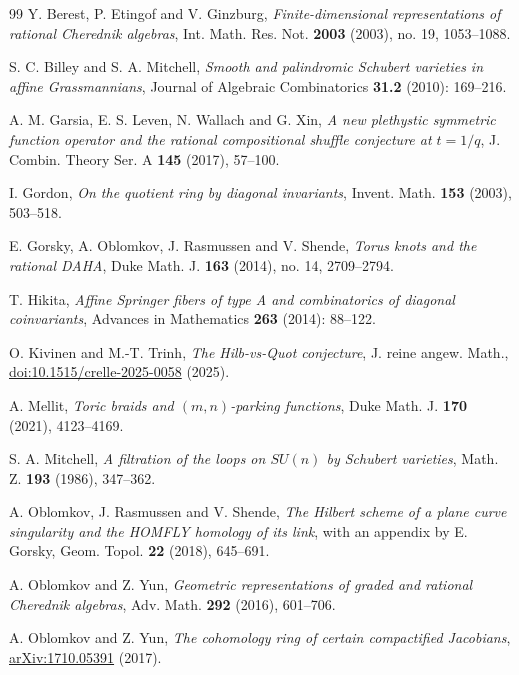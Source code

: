 \documentclass[a4paper,11pt,leqno]{amsart}
\begin{document}
\begin{thebibliography}{99}\small\setlength{\itemsep}{0pt}
 Y. Berest, P. Etingof and V. Ginzburg,
\emph{Finite-dimensional representations of rational Cherednik algebras},
Int. Math. Res. Not. \textbf{2003} (2003), no. 19, 1053--1088.

 S. C. Billey and S. A. Mitchell,
\emph{Smooth and palindromic Schubert varieties in affine Grassmannians},
Journal of Algebraic Combinatorics \textbf{31.2} (2010): 169--216.

 A. M. Garsia, E. S. Leven, N. Wallach and G. Xin,
\emph{A new plethystic symmetric function operator and the rational
compositional shuffle conjecture at $t=1/q$},
J. Combin. Theory Ser. A \textbf{145} (2017), 57--100.

 I. Gordon,
\emph{On the quotient ring by diagonal invariants},
Invent. Math. \textbf{153} (2003), 503--518.


 E. Gorsky, A. Oblomkov, J. Rasmussen and V. Shende, 
\emph{Torus knots and the rational DAHA},
Duke Math. J. \textbf{163}
(2014), no. 14, 2709–2794.


T. Hikita,
\emph{Affine Springer fibers of type A and combinatorics of diagonal coinvariants},
Advances in Mathematics \textbf{263} (2014): 88--122.


 O. Kivinen and M.-T. Trinh,
\emph{The Hilb-vs-Quot conjecture},
J. reine angew. Math., \href{https://doi.org/10.1515/crelle-2025-0058}{doi:10.1515/crelle-2025-0058} (2025).


 A. Mellit,
\emph{Toric braids and $(m,n)$-parking functions},
Duke Math. J. \textbf{170} (2021), 4123--4169.

 S. A. Mitchell,
\emph{A filtration of the loops on $SU(n)$ by Schubert varieties},
Math. Z. \textbf{193} (1986), 347--362.

 A. Oblomkov, J. Rasmussen and V. Shende,
\emph{The Hilbert scheme of a plane curve singularity and the HOMFLY
homology of its link}, with an appendix by E. Gorsky,
Geom. Topol. \textbf{22} (2018), 645--691.

 A. Oblomkov and Z. Yun,
\emph{Geometric representations of graded and rational Cherednik algebras},
Adv. Math. \textbf{292} (2016), 601--706.

 A. Oblomkov and Z. Yun,
\emph{The cohomology ring of certain compactified Jacobians},
\href{https://arxiv.org/abs/1710.05391}{arXiv:1710.05391} (2017).

\end{thebibliography}
\end{document}
